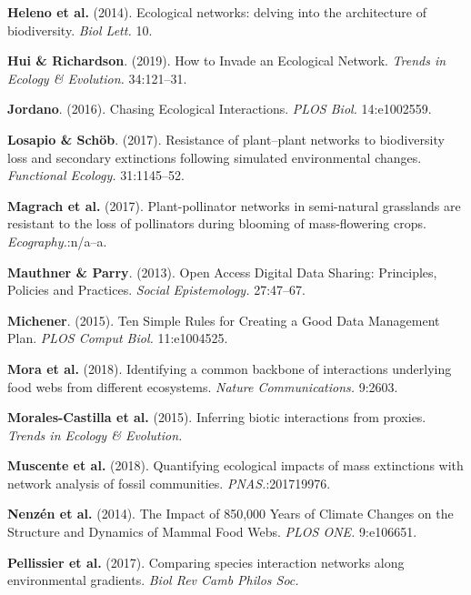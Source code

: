\leavevmode\hypertarget{ref-HeleGarc14}{}%
\textbf{Heleno et al.} (2014). Ecological networks: delving into the
architecture of biodiversity. \emph{Biol Lett.} 10.

\leavevmode\hypertarget{ref-HuiRich19}{}%
\textbf{Hui \& Richardson}. (2019). How to Invade an Ecological Network.
\emph{Trends in Ecology \& Evolution.} 34:121--31.

\leavevmode\hypertarget{ref-Jord16}{}%
\textbf{Jordano}. (2016). Chasing Ecological Interactions. \emph{PLOS
Biol.} 14:e1002559.

\leavevmode\hypertarget{ref-LosaScho17}{}%
\textbf{Losapio \& Schöb}. (2017). Resistance of plant--plant networks
to biodiversity loss and secondary extinctions following simulated
environmental changes. \emph{Functional Ecology.} 31:1145--52.

\leavevmode\hypertarget{ref-MagrHolz17}{}%
\textbf{Magrach et al.} (2017). Plant-pollinator networks in
semi-natural grasslands are resistant to the loss of pollinators during
blooming of mass-flowering crops. \emph{Ecography.}:n/a--a.

\leavevmode\hypertarget{ref-MautParr13}{}%
\textbf{Mauthner \& Parry}. (2013). Open Access Digital Data Sharing:
Principles, Policies and Practices. \emph{Social Epistemology.}
27:47--67.

\leavevmode\hypertarget{ref-Mich15}{}%
\textbf{Michener}. (2015). Ten Simple Rules for Creating a Good Data
Management Plan. \emph{PLOS Comput Biol.} 11:e1004525.

\leavevmode\hypertarget{ref-MoraGrav18}{}%
\textbf{Mora et al.} (2018). Identifying a common backbone of
interactions underlying food webs from different ecosystems.
\emph{Nature Communications.} 9:2603.

\leavevmode\hypertarget{ref-MoraMati15}{}%
\textbf{Morales-Castilla et al.} (2015). Inferring biotic interactions
from proxies. \emph{Trends in Ecology \& Evolution.}

\leavevmode\hypertarget{ref-MuscPrab18}{}%
\textbf{Muscente et al.} (2018). Quantifying ecological impacts of mass
extinctions with network analysis of fossil communities.
\emph{PNAS.}:201719976.

\leavevmode\hypertarget{ref-NenzMont14}{}%
\textbf{Nenzén et al.} (2014). The Impact of 850,000 Years of Climate
Changes on the Structure and Dynamics of Mammal Food Webs. \emph{PLOS
ONE.} 9:e106651.

\leavevmode\hypertarget{ref-PellAlbo17}{}%
\textbf{Pellissier et al.} (2017). Comparing species interaction
networks along environmental gradients. \emph{Biol Rev Camb Philos Soc.}

